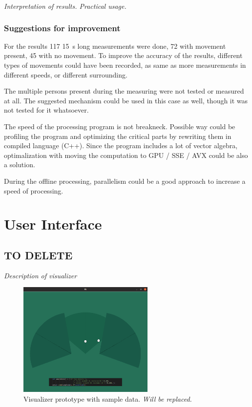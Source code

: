 {\it Interpretation of results. Practical usage. }

\subsection*{Suggestions for improvement}
For the results 117 15~s long measurements were done, 72 with movement present, 45 with no movement.
To improve the accuracy of the results, different types of movements could have been recorded, as same
as more measurements in different speeds, or different surrounding.

The multiple persons present during the measuring were not tested or measured at all. The suggested mechanism
could be used in this case as well, though it was not tested for it whatsoever.

The speed of the processing program is not breakneck. Possible way could be profiling the program and optimizing
the critical parts by rewriting them in compiled language (C++). Since the program includes a lot of vector
algebra, optimalization with moving the computation to GPU / SSE / AVX could be also a solution.

During the offline processing, parallelism could be a good approach to increase a speed of processing.




\chapter{User Interface}
\label{Label:UI}

\section{TO DELETE}
{\it Description of visualizer}
\begin{figure}[h!]
\begin{center}
\includegraphics[width=0.6\textwidth]{img/visualizer.png}
\caption{Visualizer prototype with sample data. {\it Will be replaced.} \label{fig:visualizer}}
\end{center}
\end{figure}






